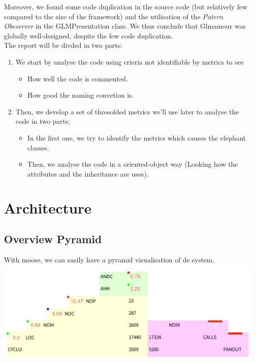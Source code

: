 \documentclass[11pt,a4paper]{article}
\begin{document}
Moreover, we found some code duplication in the source code (but relatively few compared to the size of the framework) and the utilisation  of the \textit{Patern Obeserver} in the GLMPresentation class. We thus conclude that Glmamour was globally well-designed, despite the few code duplication.\\

The report will be divded in two parts:\\
\begin{enumerate}
	\item We start by analyse the code using crieria not identifiable by metrics to see
		\begin{itemize}
		\item How well the code is commented.
		\item How good the naming convetion is.
		\end{itemize}
	\item Then, we develop a set of thresolded metrics we'll use later to analyse the code in two parts;
		\begin{itemize}
			\item In the first one, we try to identify the metrics which causes the elephant classes.
			\item Then, we analyse the code in a oriented-object way (Looking how the attributes and the inheritance are uses).
		\end{itemize}   
 \end{enumerate}
\newpage

\section{Architecture}
\subsection{Overview Pyramid}
With moose, we can easily have a pyramid visualisation of de system.\\
\includegraphics[width=\textwidth]{pyramid}
\end{document}
